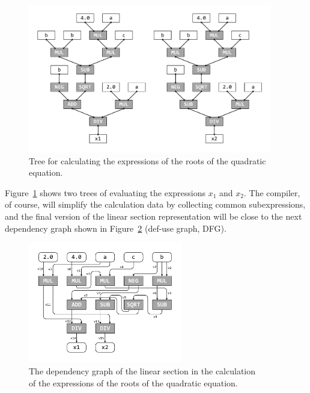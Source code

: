 \documentclass[
11pt,%
tightenlines,%
twoside,%
onecolumn,%
nofloats,%
nobibnotes,%
nofootinbib,%
superscriptaddress,%
noshowpacs,%
centertags]%
{revtex4}
\begin{document}
\begin{figure}[h]
\setcaptionmargin{5mm}
\includegraphics[width=0.95\textwidth]{pics/square_equation_calculation_tree.pdf}
\caption{Tree for calculating the expressions of the roots of the quadratic equation.}\label{fig:square_equation_calculation_tree}
\end{figure}

Figure~\ref{fig:square_equation_calculation_tree} shows two trees of evaluating the expressions $x_1$ and $x_2$.
The compiler, of course, will simplify the calculation data by collecting common subexpressions, and the final version of the linear section representation will be close to the next dependency graph shown in Figure~\ref{fig:def_use} (def-use graph, DFG).

\begin{figure}[h]
\setcaptionmargin{5mm}
\onelinecaptionsfalse %
\includegraphics[width=0.60\textwidth]{pics/def_use.pdf}
\caption{The dependency graph of the linear section in the calculation \\ of the expressions of the roots of the quadratic equation.}\label{fig:def_use}
\end{figure}
\end{document}

